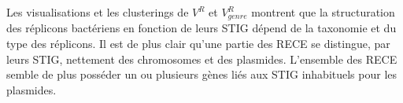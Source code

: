  Les visualisations et les clusterings de $V^{R}$ et $V_{genre}^{R}$ montrent que la structuration des réplicons bactériens en fonction de leurs STIG dépend de la taxonomie et du type des réplicons. Il est de plus clair qu'une partie des RECE se distingue, par leurs STIG, nettement des chromosomes et des plasmides. L'ensemble des RECE semble de plus posséder un ou plusieurs gènes liés aux STIG inhabituels pour les plasmides. 

\begin{landscape}


 

\end{landscape}
